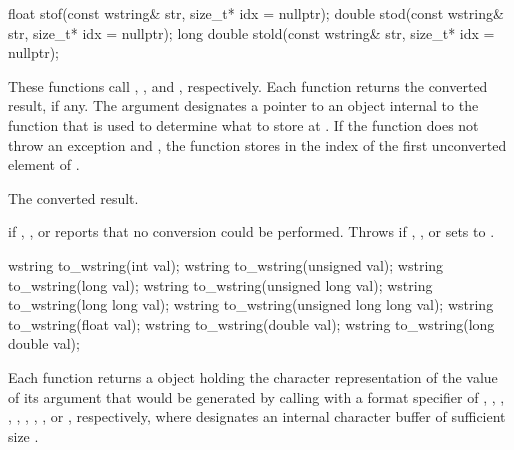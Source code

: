 %
%
%
\begin{itemdecl}
float stof(const wstring& str, size_t* idx = nullptr);
double stod(const wstring& str, size_t* idx = nullptr);
long double stold(const wstring& str, size_t* idx = nullptr);
\end{itemdecl}

\begin{itemdescr}
\pnum
\effects
These functions call ,
, and ,
respectively. Each function returns the converted
result, if any. The argument  designates a pointer to an object internal to
the function that is used to determine what to store at . If the function
does not throw an exception and , the function stores in 
the index of the first unconverted element of .

\pnum
\returns
The converted result.

\pnum
\throws
{} if , , or  reports that no
conversion could be performed. Throws  if , , or
 sets  to .
\end{itemdescr}

%
\begin{itemdecl}
wstring to_wstring(int val);
wstring to_wstring(unsigned val);
wstring to_wstring(long val);
wstring to_wstring(unsigned long val);
wstring to_wstring(long long val);
wstring to_wstring(unsigned long long val);
wstring to_wstring(float val);
wstring to_wstring(double val);
wstring to_wstring(long double val);
\end{itemdecl}

\begin{itemdescr}
\pnum
\returns
Each function returns a  object holding the character
representation of the value of its argument that would be generated by calling
 with a format specifier of
,
,
,
,
,
,
,
,
or , respectively, where  designates an
internal character buffer of sufficient size .
\end{itemdescr}

